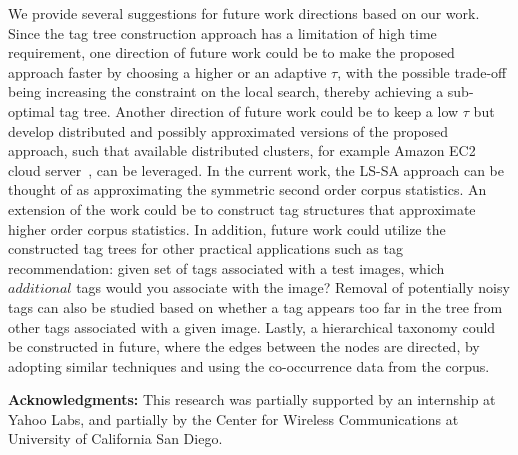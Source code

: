 We provide several suggestions for future work directions based on our work. 
Since the tag tree construction approach has a limitation of high time requirement, one direction of future work could be to make the proposed approach faster by choosing a higher or an adaptive $\tau$, with the possible trade-off being increasing the constraint on the local search, thereby achieving a sub-optimal tag tree. Another direction of future work could be to keep a low $\tau$ but develop distributed and possibly approximated versions of the proposed approach, such that available distributed clusters, for example Amazon EC2 cloud server~\cite{AmazonEC2}, can be leveraged. 
In the current work, the LS-SA approach can be thought of as approximating the symmetric second order corpus statistics. An extension of the work could be to construct tag structures that approximate higher order corpus statistics. 
In addition, future work could utilize the constructed tag trees for other practical applications such as tag recommendation: given set of tags associated with a test images, which $additional$ tags would you associate with the image? Removal of potentially noisy tags can also be studied based on whether a tag appears too far in the tree from other tags associated with a given image. Lastly, a hierarchical taxonomy could be constructed in future, where the edges between the nodes are directed, by adopting similar techniques and using the co-occurrence data from the corpus. 

\textbf{Acknowledgments:} This research was partially supported by an internship at Yahoo Labs, and partially by the Center for Wireless Communications at University of California San Diego. 


